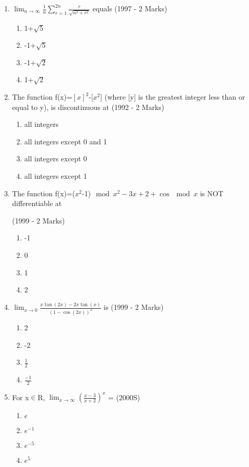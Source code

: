 \documentclass[journal,12pt,twocolumn]{IEEEtran}
\theoremstyle{remark}
\begin{document}
\begin{enumerate}[start=2]
\item $\lim_{n\to \infty}\frac{1}{n}\sum_{r=1}^{2n}\frac{r}{\sqrt{n^2+r^2}}$ equals
\hfill(1997 - 2 Marks)
  \begin{enumerate}
      \item 1+$\sqrt{5}$
      \item -1+$\sqrt{5}$
      \item -1+$\sqrt{2}$
      \item 1+$\sqrt{2}$
      
  \end{enumerate}

\item The function f(x)=$[x]^2$-[$x^2$] (where [y] is the greatest integer less than or equal to y), is discontinuous at
\hfill(1992 - 2 Marks)
     \begin{enumerate}
         \item all integers
         \item all integers except 0 and 1
         \item all integers except 0
         \item all integers except 1
         
     \end{enumerate}

\item The function f(x)=($x^2$-1)$\mod{x^2-3x+2}+\cos{\mod{x}}$ is NOT differentiable at

  \hfill(1999 - 2 Marks)
     \begin{enumerate}
         \item -1
         \item 0
         \item 1
         \item 2
         
     \end{enumerate}

\item $\lim_{x\to0}$$\frac{x\tan(2x)-2x\tan(x)}{(1-\cos(2x))^2}$ is
  \hfill(1999 - 2 Marks)
    \begin{enumerate}
        \item 2
        
        \item -2

        \item $\frac{1}{2}$
        
        \item $\frac{-1}{2}$
        
    \end{enumerate}

\item For x$\in$R, $\lim_{x\to \infty}(\frac{x-3}{x+2})^x$ =
 \hfill(2000S)
   \begin{enumerate}
       \item $e$
       \item $e^{-1}$
       \item $e^{-5}$
       \item $e^{5}$
       
   \end{enumerate}

\end{enumerate}
\end{document}

